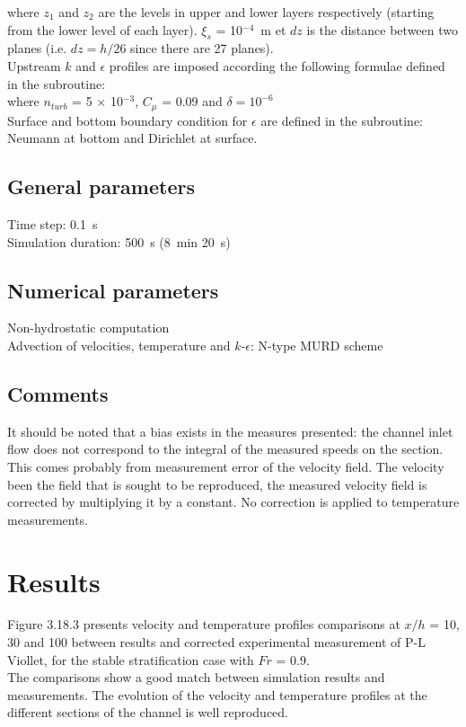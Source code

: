 where $z_1$ and $z_2$ are the levels in upper and lower layers
respectively (starting from the lower level of each layer).
$\xi_s$ = 10$^{-4}$~m et $dz$ is the distance between two planes
(i.e. $dz = h/26$ since there are 27 planes).\\
Upstream $k$ and $\epsilon$ profiles are imposed according the following
formulae defined in the  subroutine:\\

where $n_{turb}$ = 5 $\times$ 10$^{-3}$, $C_\mu$ = 0.09 and
$\delta = 10^{-6}$\\
Surface and bottom boundary condition for $\epsilon$ are defined in the
 subroutine: Neumann at bottom and Dirichlet at surface.
%
\subsection{General parameters}
%
Time step: 0.1~s\\
Simulation duration: 500~s (8~min 20~s)
%
%
%
\subsection{Numerical parameters}
%
Non-hydrostatic computation\\
Advection of velocities, temperature and $k$-$\epsilon$: N-type MURD
scheme
%
\subsection{Comments}
%
It should be noted that a bias exists in the measures presented:
the channel inlet flow does not correspond to the integral of the
measured speeds on the section.
This comes probably from measurement error of the velocity field.
The velocity been the field that is sought to be reproduced, the
measured velocity field is corrected by multiplying it by a constant.
No correction is applied to temperature measurements.
%
%
%
\section{Results}
%
Figure 3.18.3 presents velocity and temperature profiles comparisons
at $x/h$ = 10, 30 and 100 between  results and corrected
experimental measurement of P-L Viollet, for the stable stratification
case with $Fr$ = 0.9.\\
The comparisons show a good match between simulation results and
measurements.
The evolution of the velocity and temperature profiles at the different
sections of the channel is well reproduced.
%
